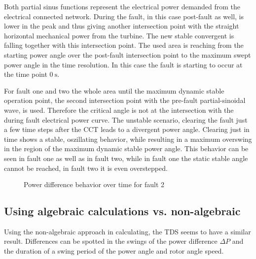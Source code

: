 Both partial sinus functions represent the electrical power demanded from the electrical connected network. During the fault, in this case post-fault as well, is lower in the peak and thus giving another intersection point with the straight horizontal mechanical power from the turbine. The new stable convergent is falling together with this intersection point. The used area is reaching from the starting power angle over the post-fault intersection point to the maximum swept power angle in the time resolution. In this case the fault is starting to occur at the time point $0~\mathrm{s}$.

For fault one and two the whole area until the maximum dynamic stable operation point, the second intersection point with the pre-fault partial-sinoidal wave, is used. Therefore the critical angle is not at the intersection with the during fault electrical power curve. The unstable scenario, clearing the fault just a few time steps after the \acs{CCT} leads to a divergent power angle. Clearing just in time shows a stable, oszillating behavior, while resulting in a maximum overswing in the region of the maximum dynamic stable power angle. This behavior can be seen in fault one as well as in fault two, while in fault one the static stable angle cannot be reached, in fault two it is even overstepped.

\begin{figure}[H]
        \centering
        
        \caption[Power difference behavior over time for fault 2]{Power difference behavior over time for fault 2}
        \label{fig:pd-fault2}
\end{figure}



\subsection{Using algebraic calculations vs. non-algebraic}

Using the non-algebraic approach in calculating, the \acs{TDS} seems to have a similar result. Differences can be spotted in the swings of the power difference $\Delta P$ and the duration of a swing period of the power angle and rotor angle speed.



